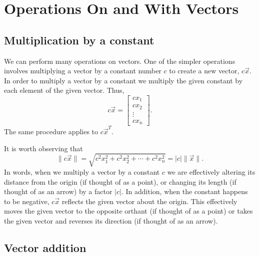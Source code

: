 \documentclass[../book.tex]{subfiles}
\begin{document}
\section{Operations On and With Vectors}

\subsection{Multiplication by a constant}

We can perform many operations on vectors. One of the simpler operations involves multiplying a vector by a constant number \(c\) to create a new vector, \(c \vec{x}\). In order to multiply a vector by a constant we multiply the given constant by each element of the given vector. Thus,
\begin{equation}\label{eq:vec-5}
c  \vec{x}
=
\begin{bmatrix}
  c x_1 \\ c x_2\\ \vdots \\ c x_n
\end{bmatrix}.
\end{equation}
The same procedure applies to \(c \vec{x}^{ T}\).

It is worth observing that
\begin{equation}\label{eq:vec-6}
\| c \vec{x}\|
=
\sqrt{c^2  x_1^2 + c^2 x_2^2 + \cdots + c^2  x_n^2}
=
|c| \| \vec{x}\|.
\end{equation}
In words, when we multiply a vector by a constant \(c\) we are effectively altering its distance from the origin  (if thought of as a point), or changing its length (if thought of as an arrow) by a factor \(|c|\). In addition, when the constant happens to be negative, \(c  \vec{x}\) reflects the given vector about the origin. This effectively moves the given vector to the opposite orthant (if thought of as a point) or takes the given vector and reverses its direction (if thought of as an arrow).

\subsection{Vector addition}
\end{document}
